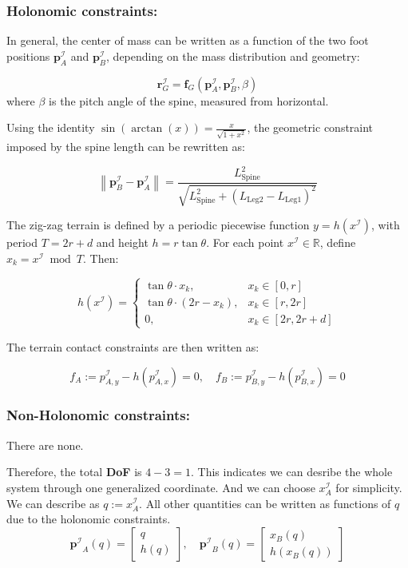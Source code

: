\documentclass[11pt]{article}
\begin{document}
\subsubsection{Holonomic constraints:}
In general, the center of mass can be written as a function of the two foot positions \( \mathbf{p}_A^\mathcal{I} \) and \( \mathbf{p}_B^\mathcal{I} \), depending on the mass distribution and geometry:

\[
\mathbf{r}_G^\mathcal{I} = \mathbf{f}_G\left( \mathbf{p}_A^\mathcal{I}, \mathbf{p}_B^\mathcal{I} , \beta \right)
\]
where \( \beta \) is the pitch angle of the spine, measured from horizontal.

Using the identity \( \sin(\arctan(x)) = \frac{x}{\sqrt{1 + x^2}} \), the geometric constraint imposed by the spine length can be rewritten as:

\[
\left\| \mathbf{p}_B^\mathcal{I} - \mathbf{p}_A^\mathcal{I} \right\| =
\frac{L_\text{Spine}^2}{\sqrt{L_\text{Spine}^2 + \left(L_{\text{Leg}2} - L_{\text{Leg}1}\right)^2}}
\]

The zig-zag terrain is defined by a periodic piecewise function \( y = h(x^\mathcal{I}) \), with period \( T = 2r + d \) and height \( h = r \tan\theta \). For each point \( x^\mathcal{I} \in \mathbb{R} \), define \( x_k = x^\mathcal{I} \bmod T \). Then:

\[
h(x^\mathcal{I}) =
\begin{cases}
\tan\theta \cdot x_k, & x_k \in [0, r] \\
\tan\theta \cdot (2r - x_k), & x_k \in [r, 2r] \\
0, & x_k \in [2r, 2r + d]
\end{cases}
\]

The terrain contact constraints are then written as:

\[
f_A := p_{A,y}^\mathcal{I} - h(p_{A,x}^\mathcal{I}) = 0, \quad
f_B := p_{B,y}^\mathcal{I} - h(p_{B,x}^\mathcal{I}) = 0
\]

\subsubsection{Non-Holonomic constraints:}
\indent \indent There are none.

\vspace{10pt}
Therefore, the total \textbf{DoF} is \(4-3 =1\). This indicates we can desribe the whole system through one generalized
coordinate. And we can choose \(x_{A}^{\mathcal{I}}\) for simplicity. We can describe as \( q := x_A^\mathcal{I} \). All other quantities can be written as functions of \( q \) due to the holonomic constraints.
\[
\mathbf{p^\mathcal{I}}_A(q) =
\begin{bmatrix}
q \\
h(q)
\end{bmatrix}, \quad
\mathbf{p^\mathcal{I}}_B(q) =
\begin{bmatrix}
x_B(q) \\
h(x_B(q))
\end{bmatrix}
\]
\end{document}
